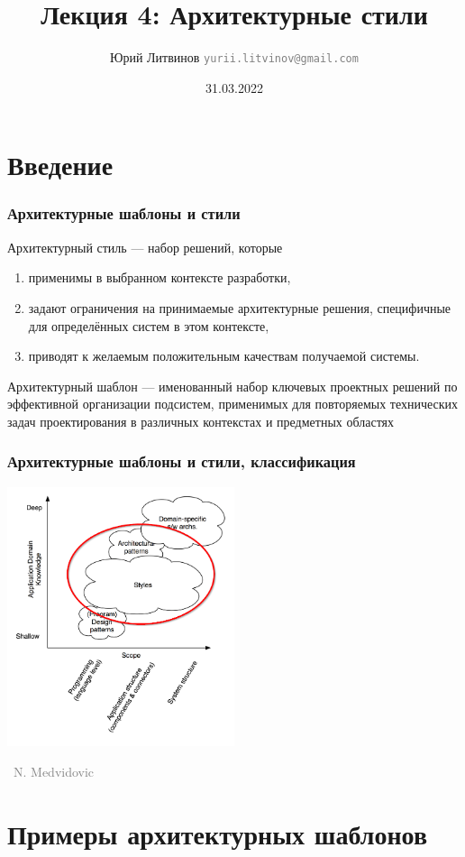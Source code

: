 \documentclass[xetex,mathserif,serif]{beamer}
\title{Лекция 4: Архитектурные стили}
\author[Юрий Литвинов]{Юрий Литвинов \newline \textcolor{gray}{\small\texttt{yurii.litvinov@gmail.com}}}
\date{31.03.2022}
\newcommand{\attribution}[1] {
    \vspace{-5mm}\begin{flushright}\begin{scriptsize}\textcolor{gray}{\textcopyright\, #1}\end{scriptsize}\end{flushright}
}
\begin{document}
    
    \frame{\titlepage}

    \section{Введение}

    \begin{frame}
        \frametitle{Архитектурные шаблоны и стили}
        Архитектурный стиль --- набор решений, которые
        \begin{enumerate}
            \item применимы в выбранном контексте разработки,
            \item задают ограничения на принимаемые архитектурные решения, специфичные для определённых систем в этом контексте,
            \item приводят к желаемым положительным качествам получаемой системы.
        \end{enumerate}
        Архитектурный шаблон --- именованный набор ключевых проектных решений по эффективной организации подсистем, применимых для повторяемых технических задач проектирования в различных контекстах и предметных областях
    \end{frame}

    \begin{frame}
        \frametitle{Архитектурные шаблоны и стили, классификация}
        \begin{center}
            \includegraphics[width=0.5\textwidth]{architecturalStylesHighlighted.png}
            \attribution{N. Medvidovic}
        \end{center}
    \end{frame}

    \section{Примеры архитектурных шаблонов}
\end{document}
